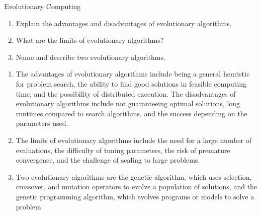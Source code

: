 \documentclass{article}
\begin{document}
\begin{exercise}{Evolutionary Computing}
  \begin{enumerate}
    \item Explain the advantages and disadvantages of evolutionary algorithms.
    \item What are the limits of evolutionary algorithms?
    \item Name and describe two evolutionary algorithms.
  \end{enumerate}

  \begin{solution}
    \begin{enumerate}
      \item The advantages of evolutionary algorithms include being a general heuristic for problem search, the ability to find good solutions in feasible computing time, and the possibility of distributed execution. The disadvantages of evolutionary algorithms include not guaranteeing optimal solutions, long runtimes compared to search algorithms, and the success depending on the parameters used.
      \item The limits of evolutionary algorithms include the need for a large number of evaluations, the difficulty of tuning parameters, the risk of premature convergence, and the challenge of scaling to large problems.
      \item Two evolutionary algorithms are the genetic algorithm, which uses selection, crossover, and mutation operators to evolve a population of solutions, and the genetic programming algorithm, which evolves programs or models to solve a problem.
    \end{enumerate}
  \end{solution}
\end{exercise}
\end{document}
